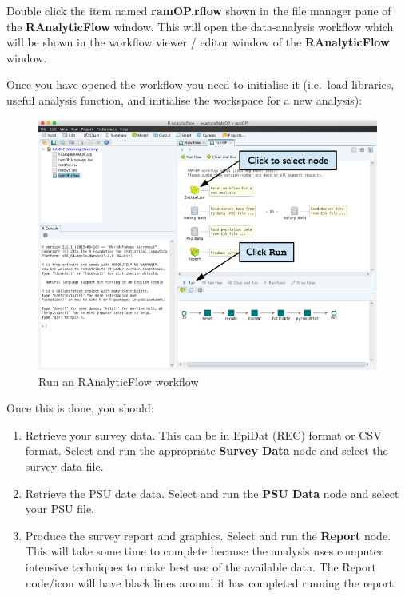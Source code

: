 \documentclass[12pt,]{book}
\theoremstyle{definition}
\theoremstyle{definition}
\theoremstyle{definition}
\theoremstyle{remark}
\begin{document}
Double click the item named \textbf{ramOP.rflow} shown in the file
manager pane of the \textbf{RAnalyticFlow} window. This will open the
data-analysis workflow which will be shown in the workflow viewer /
editor window of the \textbf{RAnalyticFlow} window.

Once you have opened the workflow you need to initialise it (i.e.~load
libraries, useful analysis function, and initialise the workspace for a
new analysis):

\begin{figure}[h]

{\centering \includegraphics[width=10.12in]{figures/runWorkflowRAF} 

}

\caption{Run an RAnalyticFlow workflow}\label{fig:raf4}
\end{figure}

Once this is done, you should:

\begin{enumerate}
\def\labelenumi{\arabic{enumi}.}
\item
  Retrieve your survey data. This can be in EpiDat (REC) format or CSV
  format. Select and run the appropriate \textbf{Survey Data} node and
  select the survey data file.
\item
  Retrieve the PSU date data. Select and run the \textbf{PSU Data} node
  and select your PSU file.
\item
  Produce the survey report and graphics. Select and run the
  \textbf{Report} node. This will take some time to complete because the
  analysis uses computer intensive techniques to make best use of the
  available data. The Report node/icon will have black lines around it
  has completed running the report.
\end{enumerate}
\end{document}
